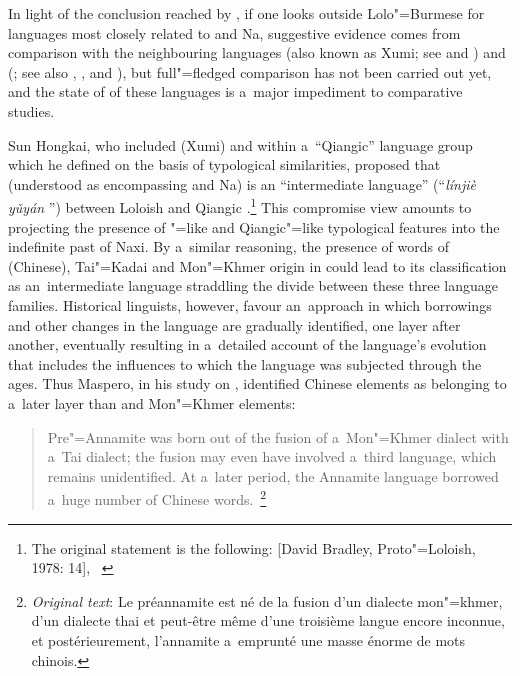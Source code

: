 In light of the conclusion reached by \citet{Bradley1975}, if one looks outside Lolo"={Burmese} for
languages most closely related to  and Na, suggestive evidence comes from comparison with the
neighbouring languages   (also known as Xumi; see \citealt{huangetal1991} and \citealt{chirkovaetal22013}) and   (\citealt{lama1994}; see also \citealt{sun2001}, \citealt{yang2006}, and \citealt{lakhietal2010}), but full"=fledged comparison
has not been carried out yet, and the state of  of these languages is a~major
impediment to comparative studies.

Sun Hongkai, who included  (Xumi) and  within a~“Qiangic” language group which he defined on
the basis of typological similarities, proposed that  (understood as encompassing  and Na)
is an “intermediate language” (“\textit{línjiè yǔyán} ”) between Loloish and Qiangic
\citep{sun1984}.\footnote{The original
	statement is the following: 
	[David Bradley, Proto"=Loloish, 1978: 14], 
	~\citep[14]{sun1984}} This compromise view amounts to projecting the presence of "=like and Qiangic"=like
typological features into the indefinite past of {Naxi}. By a~similar reasoning, the presence of words
of  (Chinese), Tai"=Kadai and Mon"=Khmer origin in  could lead to its classification as an~intermediate language straddling the divide between these three language families.  Historical
linguists, however, favour an~approach in which borrowings and other changes in the language
are gradually identified, one layer after another, eventually resulting in a~detailed account of the
language’s evolution that includes the influences to which the language was subjected through the
ages. Thus Maspero, in his study on , identified Chinese elements as belonging to a~later layer than  and Mon"=Khmer elements:

\begin{quotation}
	Pre"=Annamite was born out of the fusion of a~Mon"=Khmer dialect with a~{Tai} dialect; the fusion may
	even have involved a~third language, which remains unidentified. At a~later period, the Annamite
	language borrowed a~huge number of Chinese words.~\citep[118]{maspero1912}\footnote{\textit{Original text}: Le préannamite est né de la fusion d'un dialecte mon"=khmer, d'un dialecte thai et peut-être même d'une troisième langue encore inconnue, et postérieurement, l'annamite a~emprunté une masse énorme de mots chinois.}
\end{quotation}

